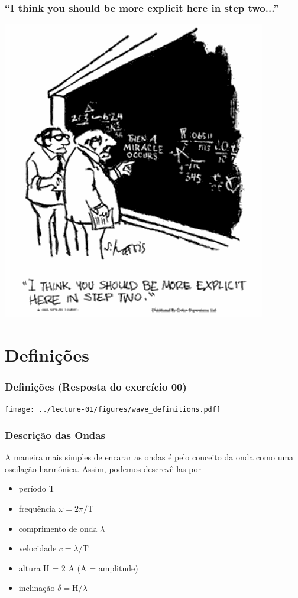 \begin{frame}
  \frametitle{``I think you should be more explicit here in step two...''}
  \includegraphics[scale=0.45]{./figures/then-a-miracle-occurs-cartoon.png}
\end{frame}

\section{Definições}
\begin{frame}
  \frametitle{Definições (Resposta do exercício 00)}
  \begin{center}
    \texttt{[image: ../lecture-01/figures/wave\_definitions.pdf]}
  \end{center}
\end{frame}

\begin{frame}
\frametitle{Descrição das Ondas}
  \begin{block}{}
    A maneira mais simples de encarar as ondas é pelo conceito da onda como uma
    oscilação harmônica. Assim, podemos descrevê-las por
  \end{block}
    \begin{itemize}[<+-| alert@+>]
      \item período T
      \item frequência $\omega = 2 \pi / \text{T}$
      \item comprimento de onda $\lambda$
      \item velocidade $c = \lambda / \text{T}$
      \item altura H = 2 A (A = amplitude)
      \item inclinação $\delta = \text{H} / \lambda$
    \end{itemize}
\end{frame}

